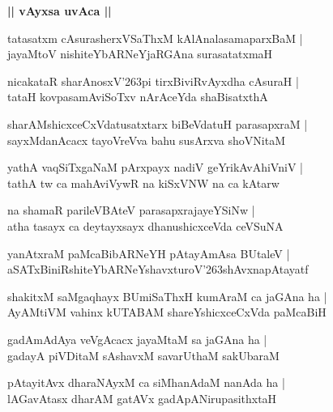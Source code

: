 \documentclass[twoside,12pt,openright]{book}
\def\S{\char'263}
\newcounter{shloka}[chapter]
\def\uvaca#1{\centerline{{\large\textbf{#1}}}}
\begin{document}
\uvaca{|| vAyxsa uvAca ||}

\begin{shloka}%
tatasatxm cAsurasherxVSaThxM kAlAnalasamaparxBaM |\\
jayaMtoV nishiteYbARNeYjaRGAna surasatatxmaH 
\end{shloka}

\begin{shloka}%
nicakataR sharAnosxV\S pi tirxBiviRvAyxdha cAsuraH |\\
tataH kovpasamAviSoTxv nArAceYda shaBisatxthA 
\end{shloka}

\begin{shloka}%
sharAMshicxceCxVdatusatxtarx biBeVdatuH parasapxraM |\\
sayxMdanAcacx tayoVreVva bahu susArxva shoVNitaM 
\end{shloka}

\begin{shloka}%
yathA vaqSiTxgaNaM pArxpayx nadiV geYrikAvAhiVniV |\\
tathA tw ca mahAviVywR na kiSxVNW na ca kAtarw 
\end{shloka}

\begin{shloka}%
na shamaR parileVBAteV parasapxrajayeYSiNw |\\
atha tasayx ca deytayxsayx dhanushicxceVda ceVSuNA 
\end{shloka}

\begin{shloka}%
yanAtxraM paMcaBibARNeYH pAtayAmAsa BUtaleV |\\
aSATxBiniRshiteYbARNeYshavxturoV\S shAvxnapAtayatf
\end{shloka}

\begin{shloka}%
shakitxM saMgaqhayx BUmiSaThxH kumAraM ca jaGAna ha |\\
AyAMtiVM vahinx kUTABAM shareYshicxceCxVda paMcaBiH 
\end{shloka}

\begin{shloka}%
gadAmAdAya veVgAcacx jayaMtaM sa jaGAna ha |\\
gadayA piVDitaM sAshavxM savarUthaM sakUbaraM 
\end{shloka}

\begin{shloka}%
pAtayitAvx dharaNAyxM ca siMhanAdaM nanAda ha |\\
lAGavAtasx dharAM gatAVx gadApANirupasithxtaH 
\end{shloka}
\end{document}
